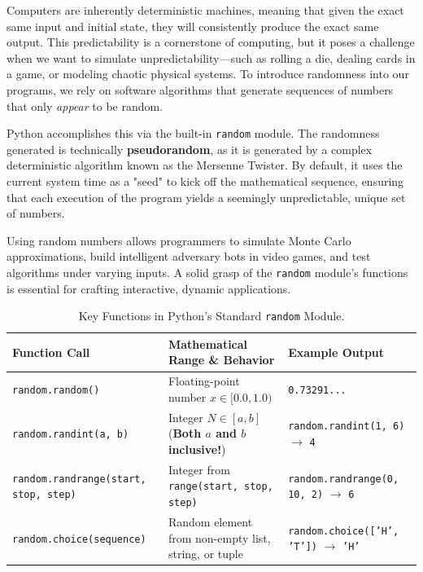 Computers are inherently deterministic machines, meaning that given the exact same input and initial state, they will consistently produce the exact same output. This predictability is a cornerstone of computing, but it poses a challenge when we want to simulate unpredictability---such as rolling a die, dealing cards in a game, or modeling chaotic physical systems. To introduce randomness into our programs, we rely on software algorithms that generate sequences of numbers that only \textit{appear} to be random.

Python accomplishes this via the built-in \texttt{random} module. The randomness generated is technically \textbf{pseudorandom}, as it is generated by a complex deterministic algorithm known as the Mersenne Twister. By default, it uses the current system time as a "seed" to kick off the mathematical sequence, ensuring that each execution of the program yields a seemingly unpredictable, unique set of numbers.

Using random numbers allows programmers to simulate Monte Carlo approximations, build intelligent adversary bots in video games, and test algorithms under varying inputs. A solid grasp of the \texttt{random} module's functions is essential for crafting interactive, dynamic applications.

\begin{table}[htbp]
\centering
\small
\renewcommand{\arraystretch}{1.3}
\begin{tabularx}{\linewidth}{l>{\raggedright\arraybackslash}Xl}
\toprule
\textbf{Function Call} & \textbf{Mathematical Range \& Behavior} & \textbf{Example Output} \\
\midrule
\texttt{random.random()} & Floating-point number $x \in [0.0, 1.0)$ & \texttt{0.73291...} \\
\texttt{random.randint(a, b)} & Integer $N \in [a, b]$ (\textbf{Both $a$ and $b$ inclusive!}) & \texttt{random.randint(1, 6)} $\to$ \texttt{4} \\
\texttt{random.randrange(start, stop, step)} & Integer from \texttt{range(start, stop, step)} & \texttt{random.randrange(0, 10, 2)} $\to$ \texttt{6} \\
\texttt{random.choice(sequence)} & Random element from non-empty list, string, or tuple & \texttt{random.choice(['H', 'T'])} $\to$ \texttt{'H'} \\
\bottomrule
\end{tabularx}
\caption{Key Functions in Python's Standard \texttt{random} Module.}
\label{tab:random-functions}
\end{table}


